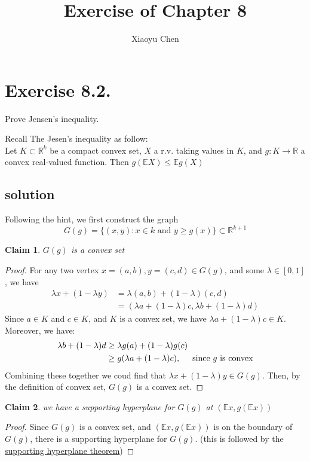 \documentclass{article}
\title{Exercise of Chapter 8}
\author{Xiaoyu Chen}
\date{}
\newtheorem{claim}{Claim}
\begin{document}
\maketitle
\section{Exercise 8.2.}
Prove Jensen's inequality.

\flushleft Recall The Jesen's inequality as follow: \\
Let $K\subset \mathbb{R}^k$ be a compact convex set, $X$ a r.v. taking values in $K$,
and $g: K\to \mathbb{R}$ a convex real-valued function. Then $g(\mathbb{E} X) \leq \mathbb{E} g(X)$
\subsection{solution}
Following the hint, we first construct the graph
\[G(g) = \{(x, y) : \mbox{$x\in k$ and $y\geq g(x)$}\} \subset \mathbb{R}^{k+1}\]
\begin{claim}
  $G(g)$ is a convex set
\end{claim}
\begin{proof}
For any two vertex $x = (a, b), y = (c, d) \in G(g)$, and some $\lambda \in [0, 1]$, we have
\begin{align*}
  \lambda x + (1-\lambda y) &= \lambda(a, b) + (1-\lambda)(c,d) \\
  &= (\lambda a + (1-\lambda)c, \lambda b + (1-\lambda) d)
\end{align*}
Since $a\in K$ and $c\in K$, and $K$ is a convex set, we have $\lambda a + (1-\lambda) c \in K$.
Moreover, we have:
\begin{align*}
  \lambda b + (1-\lambda) d &\geq \lambda g(a) + (1-\lambda) g(c) \\
  &\geq g(\lambda a + (1-\lambda) c),\hspace{0.5cm} \mbox{since $g$ is convex}
\end{align*}
Combining these together we coud find that $\lambda x + (1-\lambda) y \in G(g)$.
Then, by the definition of convex set, $G(g)$ is a convex set.
\end{proof}
\begin{claim}
  we have a supporting hyperplane for $G(g)$ at $(\mathbb{E} x, g(\mathbb{E} x))$
\end{claim}
\begin{proof}
  Since $G(g)$ is a convex set, and $(\mathbb{E} x, g(\mathbb{E} x))$ is on the boundary of $G(g)$, there is a supporting hyperplane for $G(g)$.
  (this is followed by the
  \href{https://en.wikipedia.org/wiki/Supporting_hyperplane}
       {supporting hyperplane theorem})
\end{proof}
\end{document}
